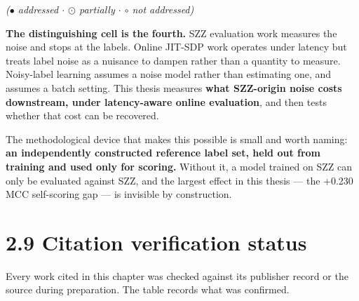 \emph{(\ensuremath{\bullet} addressed \ensuremath{\cdot} \ensuremath{\odot} partially \ensuremath{\cdot} \ensuremath{\circ} not addressed)}

\textbf{The distinguishing cell is the fourth.} SZZ evaluation work
measures the noise and stops at the labels. Online JIT-SDP work operates
under latency but treats label noise as a nuisance to dampen rather than
a quantity to measure. Noisy-label learning assumes a noise model rather
than estimating one, and assumes a batch setting. This thesis measures
\textbf{what SZZ-origin noise costs downstream, under latency-aware
online evaluation}, and then tests whether that cost can be recovered.

The methodological device that makes this possible is small and worth
naming: \textbf{an independently constructed reference label set, held
out from training and used only for scoring.} Without it, a model
trained on SZZ can only be evaluated against SZZ, and the largest effect
in this thesis --- the +0.230 MCC self-scoring gap --- is invisible by
construction.

\section{2.9 Citation verification
status}\label{citation-verification-status}

Every work cited in this chapter was checked against its publisher
record or the source during preparation. The table records what was
confirmed.

